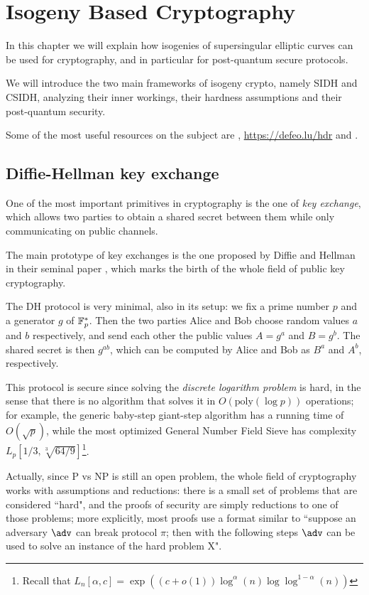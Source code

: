 \chapter{Isogeny Based Cryptography}

In this chapter we will explain how isogenies of supersingular elliptic curves can be used for cryptography, and in particular for post-quantum secure protocols.

We will introduce the two main frameworks of isogeny crypto, namely SIDH and CSIDH, analyzing their inner workings, their hardness assumptions and their post-quantum security.

Some of the most useful resources on the subject are \cite{DeFeo_intro}, \url{https://defeo.lu/hdr} and \cite{Galbraith_SIproblems}.

\section{Diffie-Hellman key exchange}

One of the most important primitives in cryptography is the one of \emph{key exchange}, which allows two parties to obtain a shared secret between them while only communicating on public channels.

The main prototype of key exchanges is the one proposed by Diffie and Hellman in their seminal paper \cite{DH}, which marks the birth of the whole field of public key cryptography.

The DH protocol is very minimal, also in its setup: we fix a prime number $p$ and a generator $g$ of $\mathbb{F}_p^\ast$. Then the two parties Alice and Bob choose random values $a$ and $b$ respectively, and send each other the public values $A=g^a$ and $B=g^b$. The shared secret is then $g^{ab}$, which can be computed by Alice and Bob as $B^a$ and $A^b$, respectively.

This protocol is secure since solving the \emph{discrete logarithm problem} is hard, in the sense that there is no algorithm that solves it in $O(\text{poly}(\log p))$ operations; for example, the generic baby-step giant-step algorithm has a running time of $O(\sqrt p)$, while the most optimized General Number Field Sieve has complexity $L_p[1/3,\sqrt[3]{64/9}]$\footnote{Recall that $L_n[\alpha, c]=\exp\left( (c+o(1))\log^\alpha(n)\log\log^{1-\alpha}(n) \right)$}.

Actually, since P vs NP is still an open problem, the whole field of cryptography works with assumptions and reductions: there is a small set of problems that are considered ``hard", and the proofs of security are simply reductions to one of those problems; more explicitly, most proofs use a format similar to ``suppose an adversary $\adv$ can break protocol $\pi$; then with the following steps $\adv$ can be used to solve an instance of the hard problem X".

